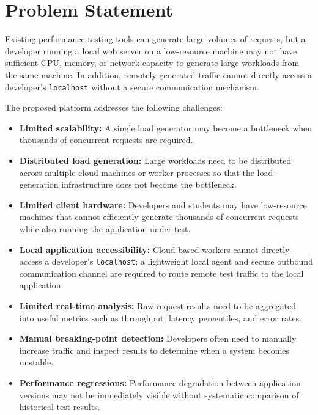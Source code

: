 \documentclass[11pt,a4paper]{article}
\begin{document}
\section{Problem Statement}

Existing performance-testing tools can generate large volumes of
requests, but a developer running a local web server on a low-resource
machine may not have sufficient CPU, memory, or network capacity to
generate large workloads from the same machine. In addition,
remotely generated traffic cannot directly access a developer's
\texttt{localhost} without a secure communication mechanism.

The proposed platform addresses the following challenges:

\begin{itemize}[leftmargin=0.7cm]

    \item \textbf{Limited scalability:} A single load generator may
    become a bottleneck when thousands of concurrent requests are
    required.

    \item \textbf{Distributed load generation:} Large workloads need
    to be distributed across multiple cloud machines or worker
    processes so that the load-generation infrastructure does not
    become the bottleneck.

    \item \textbf{Limited client hardware:} Developers and students
    may have low-resource machines that cannot efficiently generate
    thousands of concurrent requests while also running the
    application under test.

    \item \textbf{Local application accessibility:} Cloud-based workers
    cannot directly access a developer's \texttt{localhost}; a
    lightweight local agent and secure outbound communication channel
    are required to route remote test traffic to the local application.

    \item \textbf{Limited real-time analysis:} Raw request results need
    to be aggregated into useful metrics such as throughput,
    latency percentiles, and error rates.

    \item \textbf{Manual breaking-point detection:} Developers often
    need to manually increase traffic and inspect results to determine
    when a system becomes unstable.

    \item \textbf{Performance regressions:} Performance degradation
    between application versions may not be immediately visible
    without systematic comparison of historical test results.

\end{itemize}
\end{document}
